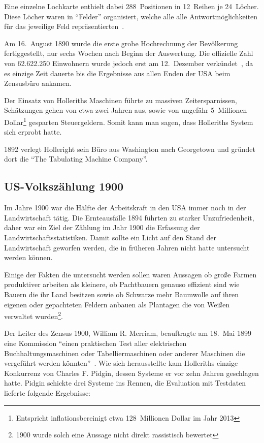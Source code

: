 \documentclass[parskip=half]{scrartcl}
\begin{document}
Eine einzelne Lochkarte enthielt dabei 288~Positionen in 12~Reihen je
24~Löcher. Diese Löcher waren in \enquote{Felder} organisiert, welche alle alle
Antwortmöglichkeiten für das jeweilige Feld
repräsentierten~\cite{priestley2010science}.

Am 16.~August 1890 wurde die erste grobe Hochrechnung der Bevölkerung
fertiggestellt, nur sechs Wochen nach Beginn der Auswertung. Die offizielle
Zahl von 62.622.250 Einwohnern wurde jedoch erst am 12.~Dezember
verkündet~\cite{austrian1982herman}, da es einzige Zeit dauerte bis die
Ergebnisse aus allen Enden der USA beim Zensusbüro ankamen.

Der Einsatz von Holleriths Maschinen führte zu massiven Zeitersparnissen,
Schätzungen gehen von etwa zwei Jahren aus, sowie von ungefähr 5~Millionen
Dollar\footnote{Entspricht inflationsbereinigt etwa 128~Millionen Dollar im
Jahr 2013} gesparten Steuergeldern. Somit kann man sagen, dass Holleriths
System sich erprobt hatte.

1892 verlegt Holleright sein Büro aus Washington nach Georgetown und gründet
dort die \enquote{The Tabulating Machine Company}.


\subsection{US-Volkszählung 1900}
\label{sec:1900}

Im Jahre 1900 war die Hälfte der Arbeitskraft in den USA immer noch in der
Landwirtschaft tätig. Die Ernteausfälle 1894 führten zu starker
Unzufriedenheit, daher war ein Ziel der Zählung im Jahr 1900 die Erfassung der
Landwirtschaftsstatistiken. Damit sollte ein Licht auf den Stand der
Landwirtschaft geworfen werden, die in früheren Jahren nicht hatte untersucht
werden können.

Einige der Fakten die untersucht werden sollen waren Aussagen ob große Farmen
produktiver arbeiten als kleinere, ob Pachtbauern genauso effizient sind wie
Bauern die ihr Land besitzen sowie ob Schwarze mehr Baumwolle auf ihren eigenen
oder gepachteten Feldern anbauen als Plantagen die von Weißen verwaltet
wurden\footnote{1900 wurde solch eine Aussage nicht direkt rassistisch
bewertet}.

Der Leiter des Zensus 1900, William R. Merriam, beauftragte am 18.~Mai 1899
eine Kommission \enquote{einen praktischen Test aller elektrischen
Buchhaltungsmaschinen oder Tabelliermaschinen oder anderer Maschinen die
vergeführt werden könnten}~\cite{austrian1982herman}. Wie sich herausstellte
kam Holleriths einzige Konkurrenz von Charles F. Pidgin, dessen Systeme er vor
zehn Jahren geschlagen hatte. Pidgin schickte drei Systeme ins Rennen, die
Evaluation mit Testdaten lieferte folgende Ergebnisse:
\end{document}
